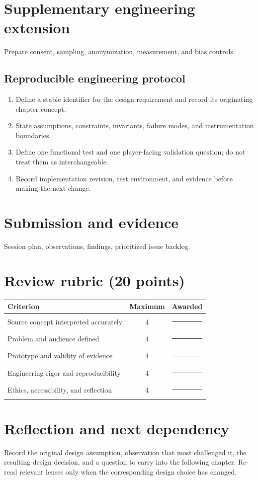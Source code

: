 \documentclass[11pt]{article}
\begin{document}
\section{Supplementary engineering extension}
Prepare consent, sampling, anonymization, measurement, and bias controls.


\subsection{Reproducible engineering protocol}
\begin{enumerate}
\item Define a stable identifier for the design requirement and record its originating chapter concept.
\item State assumptions, constraints, invariants, failure modes, and instrumentation boundaries.
\item Define one functional test and one player-facing validation question; do not treat them as interchangeable.
\item Record implementation revision, test environment, and evidence before making the next change.
\end{enumerate}

\section{Submission and evidence}
Session plan, observations, findings, prioritized issue backlog.


\section{Review rubric (20 points)}
\begin{tabularx}{\linewidth}{@{}Xcc@{}}\toprule
Criterion & Maximum & Awarded \\ \midrule
Source concept interpreted accurately & 4 & \rule{0.45in}{0.4pt}\\
Problem and audience defined & 4 & \rule{0.45in}{0.4pt}\\
Prototype and validity of evidence & 4 & \rule{0.45in}{0.4pt}\\
Engineering rigor and reproducibility & 4 & \rule{0.45in}{0.4pt}\\
Ethics, accessibility, and reflection & 4 & \rule{0.45in}{0.4pt}\\\bottomrule
\end{tabularx}

\section{Reflection and next dependency}
Record the original design assumption, observation that most challenged it, the resulting design decision, and a question to carry into the following chapter. Re-read relevant lenses only when the corresponding design choice has changed.
\end{document}
